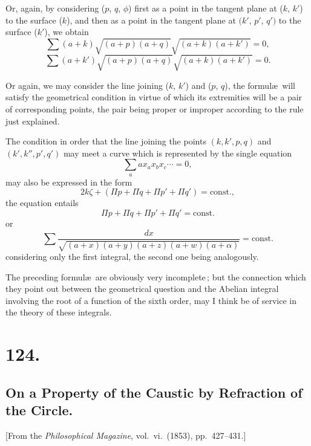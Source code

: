 \documentclass[11pt,a4paper]{article}
\theoremstyle{definition}
\begin{document}
\medskip

Or, again, by considering ($p$, $q$, $\phi$) first as a point in the tangent plane at
($k$, $k'$) to the surface ($k$), and then as a point in the tangent plane at $(k'$, $p'$, $q')$
to the surface ($k'$), we obtain
\[
\sum (a+k)\sqrt{(a+p)(a+q)}\sqrt{(a+k)(a+k')} = 0,
\]
\[
\sum (a+k')\sqrt{(a+p)(a+q)}\sqrt{(a+k)(a+k')} = 0.
\]

\medskip

Or again, we may consider the line joining ($k$, $k'$) and ($p$, $q$), the formul\ae\ will satisfy the geometrical condition in virtue of which its extremities
will be a pair of corresponding points, the pair being proper or improper according
to the rule just explained.

\medskip

\noindent The condition in order that the line joining the points $(k, k', p, q)$ and $(k', k'', p', q')$
may meet a curve which is represented by the single equation
\[
\sum_a a x_a x_b x_c \cdots = 0,
\]
may also be expressed in the form
\[
2k\zeta + (\Pi p + \Pi q + \Pi p' + \Pi q') = \mathrm{const.},
\]
the equation entails
\[
\Pi p + \Pi q + \Pi p' + \Pi q' = \mathrm{const.}
\]
or
\[
\sum \frac{dx}{\sqrt{(a+x)(a+y)(a+z)(a+w)(a+\alpha)}} = \mathrm{const.}
\]
considering only the first integral, the second one being analogously.

\medskip

The preceding formul\ae\ are obviously very incomplete\,; but the connection
which they point out between the geometrical question and the Abelian integral
involving the root of a function of the sixth order, may I think be of service in
the theory of these integrals.

\section*{124.}
\subsection*{On a Property of the Caustic by Refraction of the Circle.}

[From the \textit{Philosophical Magazine}, vol.\ vi.\ (1853), pp.\ 427--431.]

\medskip
\end{document}
